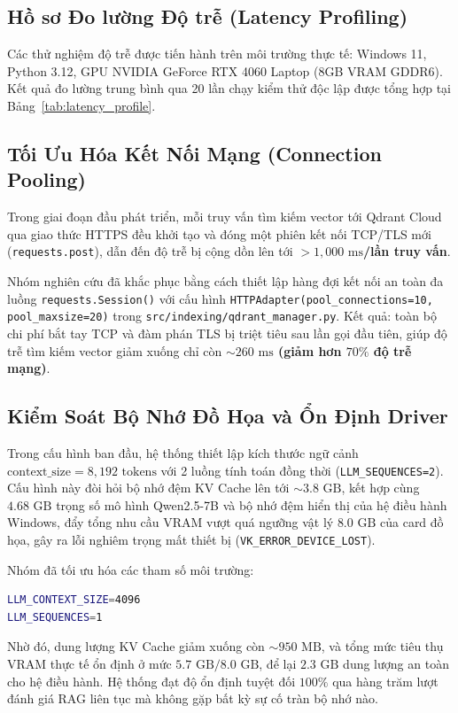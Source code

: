 \subsection{Hồ sơ Đo lường Độ trễ (Latency Profiling)}
Các thử nghiệm độ trễ được tiến hành trên môi trường thực tế: Windows 11, Python 3.12, GPU NVIDIA GeForce RTX 4060 Laptop (8GB VRAM GDDR6). Kết quả đo lường trung bình qua 20 lần chạy kiểm thử độc lập được tổng hợp tại Bảng~\ref{tab:latency_profile}.



\subsection{Tối Ưu Hóa Kết Nối Mạng (Connection Pooling)}
Trong giai đoạn đầu phát triển, mỗi truy vấn tìm kiếm vector tới Qdrant Cloud qua giao thức HTTPS đều khởi tạo và đóng một phiên kết nối TCP/TLS mới (\texttt{requests.post}), dẫn đến độ trễ bị cộng dồn lên tới \textbf{$> 1,000\text{ ms}$/lần truy vấn}.

Nhóm nghiên cứu đã khắc phục bằng cách thiết lập hàng đợi kết nối an toàn đa luồng \texttt{requests.Session()} với cấu hình \lstinline{HTTPAdapter(pool_connections=10, pool_maxsize=20)} trong \texttt{src/indexing/qdrant\_manager.py}. Kết quả: toàn bộ chi phí bắt tay TCP và đàm phán TLS bị triệt tiêu sau lần gọi đầu tiên, giúp độ trễ tìm kiếm vector giảm xuống chỉ còn \textbf{$\sim 260\text{ ms}$ (giảm hơn $70\%$ độ trễ mạng)}.

\subsection{Kiểm Soát Bộ Nhớ Đồ Họa và Ổn Định Driver}
Trong cấu hình ban đầu, hệ thống thiết lập kích thước ngữ cảnh $\text{context\_size} = 8,192\text{ tokens}$ với 2 luồng tính toán đồng thời (\lstinline{LLM_SEQUENCES=2}). Cấu hình này đòi hỏi bộ nhớ đệm KV Cache lên tới $\sim 3.8\text{ GB}$, kết hợp cùng $4.68\text{ GB}$ trọng số mô hình Qwen2.5-7B và bộ nhớ đệm hiển thị của hệ điều hành Windows, đẩy tổng nhu cầu VRAM vượt quá ngưỡng vật lý $8.0\text{ GB}$ của card đồ họa, gây ra lỗi nghiêm trọng mất thiết bị (\lstinline{VK_ERROR_DEVICE_LOST}).

Nhóm đã tối ưu hóa các tham số môi trường:
\begin{lstlisting}[language=bash]
LLM_CONTEXT_SIZE=4096
LLM_SEQUENCES=1
\end{lstlisting}
Nhờ đó, dung lượng KV Cache giảm xuống còn $\sim 950\text{ MB}$, và tổng mức tiêu thụ VRAM thực tế ổn định ở mức \textbf{$5.7\text{ GB} / 8.0\text{ GB}$}, để lại $2.3\text{ GB}$ dung lượng an toàn cho hệ điều hành. Hệ thống đạt độ ổn định tuyệt đối $100\%$ qua hàng trăm lượt đánh giá RAG liên tục mà không gặp bất kỳ sự cố tràn bộ nhớ nào.

